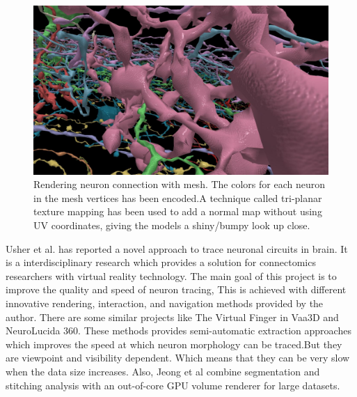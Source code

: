 \documentclass[10pt,twocolumn,letterpaper]{article}
\begin{document}
\begin{figure}[h]
\begin{center}
   \includegraphics[width=1.0\linewidth]{gen.png}
\end{center}
   \caption{Rendering neuron connection with mesh. The colors for each neuron in the mesh vertices has been encoded.A technique called tri-planar texture mapping has been used to add a normal map without using UV coordinates, giving the models a shiny/bumpy look up close.}
\label{fig:gen}
\end{figure}

Usher et al.\cite{Usher2018} has reported a novel approach to trace neuronal circuits in brain. It is a interdisciplinary research which provides a solution for connectomics researchers with virtual reality technology. The main goal of this project is to improve the quality and speed of neuron tracing, This is achieved with different innovative rendering, interaction, and navigation methods provided by the author. There are some similar projects like The Virtual Finger in Vaa3D and NeuroLucida 360. These methods provides semi-automatic extraction approaches which improves the speed at which neuron morphology can be traced.But they are viewpoint and visibility dependent. Which means that they can be very slow when the data size increases. Also, Jeong et al \cite{Jeong2010} combine segmentation and stitching analysis with an out-of-core GPU volume renderer for large datasets.
\end{document}
